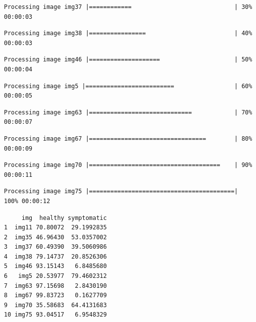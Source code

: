 \documentclass[
  letterpaper,
  DIV=11,
  numbers=noendperiod]{scrreprt}
\newenvironment{Shaded}{\begin{snugshade}}{\end{snugshade}}
\newcommand{\NormalTok}[1]{\textcolor[rgb]{0.00,0.23,0.31}{#1}}
\newcommand{\OtherTok}[1]{\textcolor[rgb]{0.00,0.23,0.31}{#1}}
\newcommand{\SpecialCharTok}[1]{\textcolor[rgb]{0.37,0.37,0.37}{#1}}
\begin{document}
\begin{verbatim}
Processing image img37 |============                             | 30% 00:00:03 
\end{verbatim}

\begin{verbatim}
Processing image img38 |================                         | 40% 00:00:03 
\end{verbatim}

\begin{verbatim}
Processing image img46 |====================                     | 50% 00:00:04 
\end{verbatim}

\begin{verbatim}
Processing image img5 |=========================                 | 60% 00:00:05 
\end{verbatim}

\begin{verbatim}
Processing image img63 |=============================            | 70% 00:00:07 
\end{verbatim}

\begin{verbatim}
Processing image img67 |=================================        | 80% 00:00:09 
\end{verbatim}

\begin{verbatim}
Processing image img70 |=====================================    | 90% 00:00:11 
\end{verbatim}

\begin{verbatim}
Processing image img75 |=========================================| 100% 00:00:12 
\end{verbatim}

\begin{Shaded}
\end{Shaded}

\begin{verbatim}
     img  healthy symptomatic
1  img11 70.80072  29.1992835
2  img35 46.96430  53.0357002
3  img37 60.49390  39.5060986
4  img38 79.14737  20.8526306
5  img46 93.15143   6.8485680
6   img5 20.53977  79.4602312
7  img63 97.15698   2.8430190
8  img67 99.83723   0.1627709
9  img70 35.58683  64.4131683
10 img75 93.04517   6.9548329
\end{verbatim}
\end{document}
